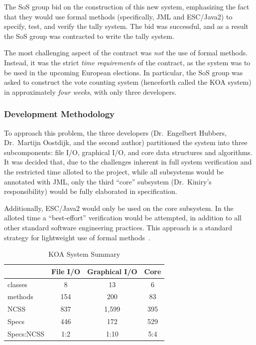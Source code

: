 \documentclass{llncs}
\begin{document}
The SoS group bid on the construction of this new system, emphasizing
the fact that they would use formal methods (specifically, JML and
ESC/Java2) to specify, test, and verify the tally system.  The bid was
successful, and as a result the SoS group was contracted to write the
tally system.

The most challenging aspect of the contract was \emph{not} the use of
formal methods.  Instead, it was the strict \emph{time requirements}
of the contract, as the system was to be used in the upcoming European
elections.  In particular, the SoS group was asked to construct the
vote counting system (henceforth called the \textsc{KOA} system) in
approximately \emph{four weeks}, with only three developers.

\subsubsection{Development Methodology}

To approach this problem, the three developers (Dr.~Engelbert Hubbers,
Dr.~Martijn Oostdijk, and the second author) partitioned the system
into three subcomponents: file I/O, graphical I/O, and core
data structures and algorithms.  It was decided that, due to the
challenges inherent in full system verification and the restricted
time alloted to the project, while all subsystems would be annotated
with JML, only the third ``core'' subsystem (Dr.~Kiniry's
responsibility) would be fully elaborated in specification.

Additionally, ESC/Java2 would only be used on the core subsystem.  In
the alloted time a ``best-effort'' verification would be attempted, in
addition to all other standard software engineering practices.  This
approach is a standard strategy for lightweight use of formal
methods~\cite{ClarkeWing96}.

\begin{table}[htbp]
  \caption{KOA System Summary}
  \label{tab:KOA_System_Summary}
  \begin{center}
    \begin{tabular}{|l|ccc|}
      \hline
      \quad     & \textbf{File I/O} & \textbf{Graphical I/O} & \textbf{Core} \\
      \hline
       classes & 8                 & 13                     & 6             \\
       methods & 154               & 200                    & 83            \\
      NCSS      & 837               & 1,599                  & 395           \\
      Specs     & 446               & 172                    & 529           \\
      Specs:NCSS & 1:2              & 1:10                   & 5:4           \\
      \hline
    \end{tabular}
  \end{center}
\end{table}
\end{document}
